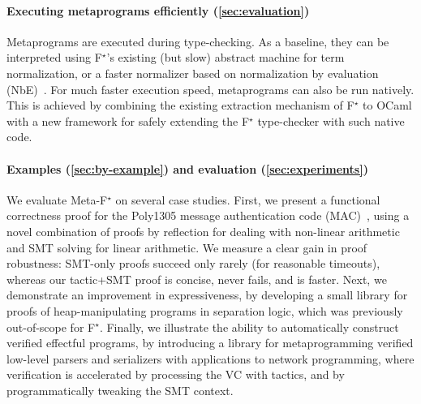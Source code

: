 \documentclass[runningheads]{llncs}
\newcommand\fstar{F$^\star$\xspace}
\newcommand\metafstar{Meta-F$^\star$\xspace}
\newcommand{\comm}[3]{\ifcheckpagebudget\else\ifdraft{{\color{#1}[#2: #3]}}\fi\fi}
\newcommand{\ch}[1]{\comm{teal}{CH}{#1}}
\newcommand{\guido}[1]{\comm{blue}{Guido}{#1}}
\begin{document}
\paragraph*{\bf Executing metaprograms efficiently (\autoref{sec:evaluation})}
Metaprograms are executed during type-checking.
%
As a baseline, they can be interpreted using \fstar's existing
(but slow) abstract machine for term normalization, or
a faster normalizer based on normalization by evaluation
(NbE)~\cite{bergerNbe, BoespflugDG11}.
%
%
For much faster execution speed, metaprograms can also be run natively.
%
This is achieved by combining the existing extraction mechanism of
\fstar to OCaml with a new framework for safely extending the \fstar
type-checker with such native code.
%
%

\paragraph*{\bf Examples (\autoref{sec:by-example}) and evaluation (\autoref{sec:experiments})}
We evaluate \metafstar on several case studies.
%
First, we present a functional correctness proof for the Poly1305
message authentication code (MAC)~\cite{poly1305}, using a novel combination
of proofs by reflection for dealing with non-linear arithmetic and SMT
solving for linear arithmetic. We measure a clear gain in proof
robustness: SMT-only proofs succeed only rarely
(for reasonable timeouts),
whereas our tactic+SMT proof is concise, never fails,
and is faster.
%
Next, we demonstrate an improvement in expressiveness,
by developing a small library for proofs of heap-manipulating programs in
separation logic, which was previously out-of-scope for \fstar.
%
Finally, we illustrate the ability to automatically construct verified
effectful programs, by introducing a library for metaprogramming verified
low-level parsers and serializers with applications to network
programming, where verification is accelerated by processing
the VC with tactics,
and by programmatically tweaking the SMT context.
\end{document}
